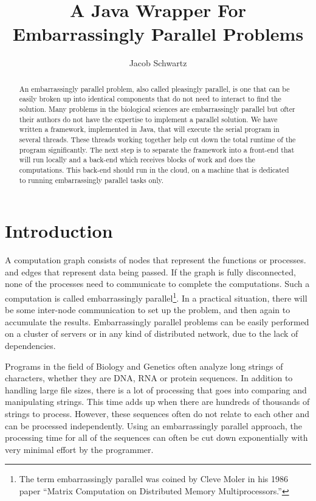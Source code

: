 \documentclass[12pt]{article}
\begin{document}
\title{A Java Wrapper For Embarrassingly Parallel Problems}
\author{Jacob Schwartz}
\maketitle

\begin{abstract}
An embarrassingly parallel problem, also called pleasingly parallel, is one that
can be easily broken up into identical components that do not need to interact
to find the solution. Many problems in the biological sciences are 
embarrassingly parallel but ofter their authors do not have the expertise to
implement a parallel solution. We have written a framework, implemented in Java,
that will execute the serial program in several threads. These threads working
together help cut down the total runtime of the program significantly. The next
step is to separate the framework into a front-end that will run locally and a
back-end which receives blocks of work and does the computations. This back-end
should run in the cloud, on a machine that is dedicated to running
embarrassingly parallel tasks only.
\end{abstract}

\section{Introduction}

A computation graph consists of nodes that represent the functions or processes.
and edges that represent data being passed. If the graph is fully disconnected,
none of the processes need to communicate to complete the computations. Such a
computation is called embarrassingly parallel\footnote{The term embarrassingly
parallel was coined by Cleve Moler in his 1986 paper ``Matrix Computation on
Distributed Memory Multiprocessors.''}. In a practical situation, there will be
some inter-node communication to set up the problem, and then again to
accumulate the results.  Embarrassingly parallel problems can be easily
performed on a cluster of servers or in any kind of distributed network, due to
the lack of dependencies. 

Programs in the field of Biology and Genetics often analyze long strings of
characters, whether they are DNA, RNA or protein sequences. In addition to
handling large file sizes, there is a lot of processing that goes into comparing
and manipulating strings. This time adds up when there are hundreds of thousands
of strings to process. However, these sequences often do not relate to each
other and can be processed independently. Using an embarrassingly parallel
approach, the processing time for all of the sequences can often be cut down
exponentially with very minimal effort by the programmer.
\end{document}
